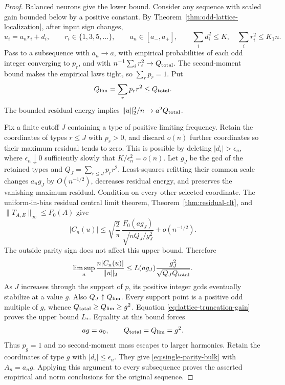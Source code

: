 \begin{proof}
Balanced neurons give the lower bound. Consider any sequence with
scaled gain bounded below by a positive constant. By
Theorem~\ref{thm:odd-lattice-localization}, after input sign changes,
\[
 u_i=a_n r_i+d_i,\qquad r_i\in\{1,3,5,\ldots\},\qquad
 a_n\in[a_-,a_+],\qquad
 \sum_i d_i^2\le K,\quad \sum_i r_i^2\le K_1 n.
\]
Pass to a subsequence with $a_n\to a$, with empirical probabilities
of each odd integer converging to $p_r$, and with
$n^{-1}\sum_i r_i^2\to Q_{\rm total}$. The second-moment bound makes
the empirical laws tight, so $\sum_rp_r=1$. Put
\[
 Q_{\rm lim}=\sum_rp_r r^2\le Q_{\rm total}.
\]
The bounded residual energy implies
$\|u\|_2^2/n\to a^2Q_{\rm total}$.

Fix a finite cutoff $J$ containing a type of positive limiting
frequency. Retain the coordinates of types $r\le J$ with $p_r>0$,
and discard $o(n)$ further coordinates so their maximum residual
tends to zero. This is possible by deleting $|d_i|>\epsilon_n$,
where $\epsilon_n\downarrow0$ sufficiently slowly that
$K/\epsilon_n^2=o(n)$. Let $g_J$ be the gcd of the retained types and
$Q_J=\sum_{r\le J}p_r r^2$. Least-squares refitting their common scale
changes $a_ng_J$ by $O(n^{-1/2})$, decreases residual energy, and
preserves the vanishing maximum residual. Condition on every other
selected coordinate. The uniform-in-bias residual central limit
theorem, Theorem~\ref{thm:residual-clt}, and
$\|T_{A,E}\|_\infty\le F_0(A)$ give
\[
 |C_n(u)|\le
 \sqrt{\frac2\pi}\,
 \frac{F_0(ag_J)}{\sqrt{nQ_J/g_J^2}}+o(n^{-1/2}).
\]
The outside parity sign does not affect this upper bound. Therefore
\begin{equation}\label{eq:lattice-truncation-gain}
 \limsup_n\frac{n|C_n(u)|}{\|u\|_2}
 \le L(ag_J)\frac{g_J^2}{\sqrt{Q_JQ_{\rm total}}}.
\end{equation}
As $J$ increases through the support of $p$, its positive integer
gcds eventually stabilize at a value $g$. Also $Q_J\uparrow Q_{\rm lim}$.
Every support point is a positive odd multiple of $g$, whence
$Q_{\rm total}\ge Q_{\rm lim}\ge g^2$. Equation
\eqref{eq:lattice-truncation-gain} proves the upper bound $L_*$.
Equality at this bound forces
\[
 ag=a_0,\qquad Q_{\rm total}=Q_{\rm lim}=g^2.
\]
Thus $p_g=1$ and no second-moment mass escapes to larger harmonics.
Retain the coordinates of type $g$ with $|d_i|\le\epsilon_n$.
They give \eqref{eq:single-parity-bulk} with $A_n=a_ng$.
Applying this argument to every subsequence proves the asserted
empirical and norm conclusions for the original sequence.
\end{proof}

